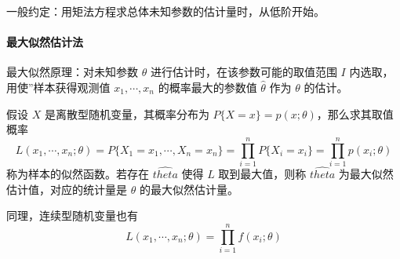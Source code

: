 一般约定：用矩法方程求总体未知参数的估计量时，从低阶开始。

\paragraph{最大似然估计法}

最大似然原理：对未知参数 $\theta$ 进行估计时，在该参数可能的取值范围 $I$ 内选取，用使”样本获得观测值 $x_1, \cdots, x_n$ 的概率最大的参数值 $\hat{\theta}$ 作为 $\theta$ 的估计。

假设 $X$ 是离散型随机变量，其概率分布为 $P\{X = x\} = p(x; \theta)$，那么求其取值概率
\[ L(x_1, \cdots, x_n;\theta) = P\{X_1 = x_1, \cdots, X_n = x_n\} = \prod_{i=1}^n P\{X_i=x_i\} = \prod_{i=1}^n p(x_i; \theta) \]
称为样本的似然函数。若存在 $\hat{theta}$ 使得 $L$ 取到最大值，则称 $\hat{theta}$ 为最大似然估计值，对应的统计量是 $\theta$ 的最大似然估计量。

同理，连续型随机变量也有
\[ L(x_1, \cdots, x_n; \theta) = \prod_{i=1}^n f(x_i; \theta) \]



